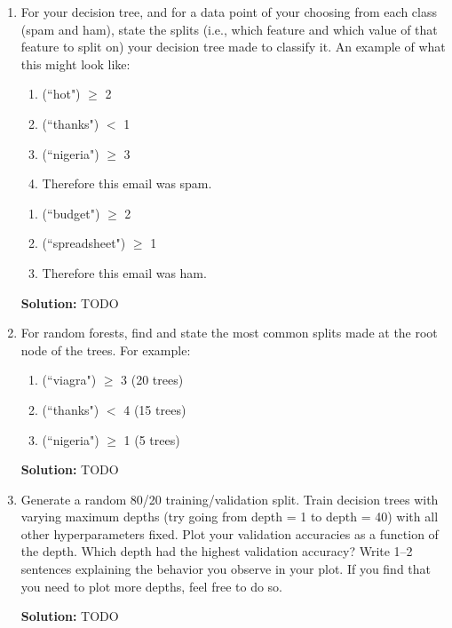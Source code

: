 \documentclass{article}
\newenvironment{solution}{\color{blue} \smallskip \textbf{Solution:}}{}
\begin{document}
\begin{enumerate}
	\item For your decision tree, and for a data point of your choosing from each class (spam and ham), state the splits (i.e., which feature and which value of that feature to split on) your decision tree made to classify it. 
 An example of what this might look like:
	\begin{enumerate}
		\item (``hot") $\geq$ 2
		\item (``thanks") $<$ 1
		\item (``nigeria") $\geq$ 3
		\item Therefore this email was spam.
	\end{enumerate}

	\begin{enumerate}
		\item (``budget") $\geq$ 2
		\item (``spreadsheet") $\geq$ 1
		\item Therefore this email was ham.
	\end{enumerate}
	
    \begin{solution}
        TODO
    \end{solution}
    
    \item 
    For random forests, find and state the most common splits made at the root node of the trees. For example:
	\begin{enumerate}
		\item (``viagra") $\geq$ 3 (20 trees)
		\item (``thanks") $<$ 4 (15 trees)
		\item (``nigeria") $\geq$ 1 (5 trees)
	\end{enumerate}

	\begin{solution}
	    TODO
	\end{solution}
	
	\item 
    Generate a random 80/20 training/validation split. 
    Train decision trees with varying maximum depths (try going from depth = 1 to depth = 40) with all other hyperparameters fixed. 
    Plot your validation accuracies as a function of the depth. 
    Which depth had the highest validation accuracy? 
    Write 1--2 sentences explaining the behavior you observe in your plot. 
    If you find that you need to plot more depths, feel free to do so.

    \begin{solution}
        TODO
    \end{solution}
\end{enumerate}
\end{document}
